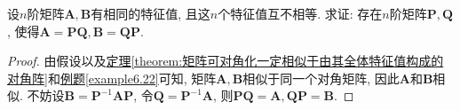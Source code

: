 \documentclass[../../main.tex]{subfiles}%
\begin{document}
\begin{example}
设$n$阶矩阵$\boldsymbol{A},\boldsymbol{B}$有相同的特征值, 且这$n$个特征值互不相等. 求证: 存在$n$阶矩阵$\boldsymbol{P},\boldsymbol{Q}$, 使得$\boldsymbol{A}=\boldsymbol{P}\boldsymbol{Q}, \boldsymbol{B}=\boldsymbol{Q}\boldsymbol{P}$.~
\end{example}
\begin{proof}

由假设以及\hyperref[theorem:矩阵可对角化一定相似于由其全体特征值构成的对角阵]{定理\ref{theorem:矩阵可对角化一定相似于由其全体特征值构成的对角阵}}和\hyperref[example6.22]{例题\ref{example6.22}}可知, 矩阵$\boldsymbol{A},\boldsymbol{B}$相似于同一个对角矩阵, 因此$\boldsymbol{A}$和$\boldsymbol{B}$相似. 不妨设$\boldsymbol{B}=\boldsymbol{P}^{-1}\boldsymbol{A}\boldsymbol{P}$, 令$\boldsymbol{Q}=\boldsymbol{P}^{-1}\boldsymbol{A}$, 则$\boldsymbol{P}\boldsymbol{Q}=\boldsymbol{A}, \boldsymbol{Q}\boldsymbol{P}=\boldsymbol{B}$. 

\end{proof}
\end{document}
